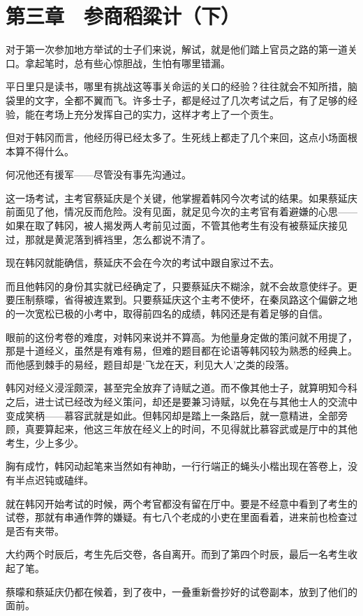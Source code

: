 \section{第三章　参商稻粱计（下）}

对于第一次参加地方举试的士子们来说，解试，就是他们踏上官员之路的第一道关口。拿起笔时，总有些心惊胆战，生怕有哪里错漏。

平日里只是读书，哪里有挑战这等事关命运的关口的经验？往往就会不知所措，脑袋里的文字，全都不翼而飞。许多士子，都是经过了几次考试之后，有了足够的经验，能在考场上充分发挥自己的实力，这样才考上了一个贡生。

但对于韩冈而言，他经历得已经太多了。生死线上都走了几个来回，这点小场面根本算不得什么。

何况他还有援军——尽管没有事先沟通过。

这一场考试，主考官蔡延庆是个关键，他掌握着韩冈今次考试的结果。如果蔡延庆前面见了他，情况反而危险。没有见面，就足见今次的主考官有着避嫌的心思——如果在取了韩冈，被人揭发两人考前见过面，不管其他考生有没有被蔡延庆接见过，那就是黄泥落到裤裆里，怎么都说不清了。

现在韩冈就能确信，蔡延庆不会在今次的考试中跟自家过不去。

而且他韩冈的身份其实就已经确定了，只要蔡延庆不糊涂，就不会故意使绊子。更要压制蔡曚，省得被连累到。只要蔡延庆这个主考不使坏，在秦凤路这个偏僻之地的一次宽松已极的小考中，取得前四名的成绩，韩冈还是有着足够的自信。

眼前的这份考卷的难度，对韩冈来说并不算高。为他量身定做的策问就不用提了，那是十道经义，虽然是有难有易，但难的题目都在论语等韩冈较为熟悉的经典上。而他感到棘手的易经，题目却是‘飞龙在天，利见大人’之类的段落。

韩冈对经义浸淫颇深，甚至完全放弃了诗赋之道。而不像其他士子，就算明知今科之后，进士试已经改为经义策问，却还是要兼习诗赋，以免在与其他士人的交流中变成笑柄——慕容武就是如此。但韩冈却是踏上一条路后，就一意精进，全部旁顾，真要算起来，他这三年放在经义上的时间，不见得就比慕容武或是厅中的其他考生，少上多少。

胸有成竹，韩冈动起笔来当然如有神助，一行行端正的蝇头小楷出现在答卷上，没有半点迟钝或磕绊。

就在韩冈开始考试的时候，两个考官都没有留在厅中。要是不经意中看到了考生的试卷，那就有串通作弊的嫌疑。有七八个老成的小吏在里面看着，进来前也检查过是否有夹带。

大约两个时辰后，考生先后交卷，各自离开。而到了第四个时辰，最后一名考生收起了笔。

蔡曚和蔡延庆仍都在候着，到了夜中，一叠重新誊抄好的试卷副本，放到了他们的面前。

